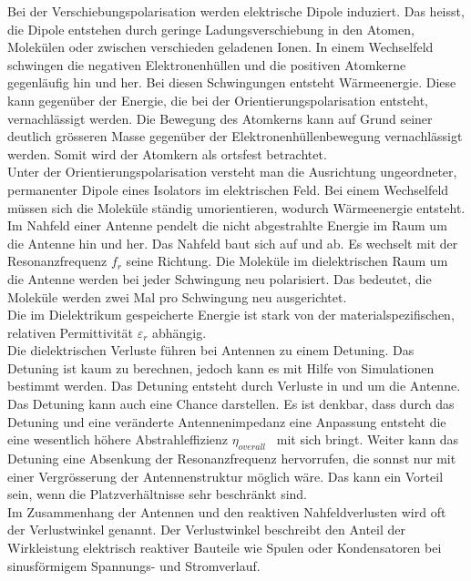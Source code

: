Bei der Verschiebungspolarisation werden elektrische Dipole  induziert. Das heisst,  die Dipole entstehen durch geringe Ladungsverschiebung in den Atomen, Molekülen oder zwischen verschieden geladenen Ionen. In einem Wechselfeld schwingen die negativen Elektronenhüllen und die positiven Atomkerne gegenläufig hin und her.  Bei diesen Schwingungen entsteht  Wärmeenergie.  Diese kann gegenüber der Energie, die bei der Orientierungspolarisation entsteht,  vernachlässigt werden.  Die Bewegung des Atomkerns kann auf Grund seiner deutlich grösseren Masse  gegenüber der Elektronenhüllenbewegung vernachlässigt werden. Somit wird der Atomkern als ortsfest betrachtet. \\
Unter der Orientierungspolarisation versteht man die Ausrichtung ungeordneter, permanenter Dipole eines Isolators im elektrischen Feld. Bei einem Wechselfeld müssen sich die Moleküle ständig umorientieren, wodurch Wärmeenergie entsteht\cite{DielektrikumPolarisation}.\\
Im Nahfeld einer Antenne pendelt die nicht abgestrahlte Energie im Raum um die Antenne hin und her. Das Nahfeld baut sich auf und ab. Es wechselt  mit der Resonanzfrequenz $f_{r}$ seine Richtung. Die Moleküle im dielektrischen Raum um die Antenne werden bei jeder Schwingung neu polarisiert. Das bedeutet, die Moleküle werden zwei Mal pro Schwingung neu ausgerichtet.\\
Die im Dielektrikum gespeicherte Energie ist stark von der materialspezifischen, relativen Permittivität $\varepsilon_r $ abhängig.\\
Die dielektrischen Verluste führen bei Antennen  zu einem Detuning. Das Detuning ist kaum zu berechnen, jedoch kann es mit Hilfe von  Simulationen bestimmt werden. Das Detuning entsteht durch Verluste in und um die  Antenne.\\ 
Das Detuning kann auch eine Chance darstellen. Es ist denkbar, dass durch das Detuning und eine veränderte Antennenimpedanz eine Anpassung  entsteht die  eine wesentlich höhere Abstrahleffizienz $\eta_{overall}$ \ mit sich bringt. Weiter kann das Detuning eine Absenkung der Resonanzfrequenz hervorrufen, die sonnst nur mit einer Vergrösserung der Antennenstruktur möglich wäre. Das kann ein Vorteil sein, wenn die Platzverhältnisse sehr beschränkt sind.\\
Im Zusammenhang der Antennen und den reaktiven Nahfeldverlusten wird oft der Verlustwinkel genannt.  Der Verlustwinkel beschreibt den Anteil der Wirkleistung elektrisch reaktiver Bauteile wie Spulen oder Kondensatoren bei sinusförmigem Spannungs- und Stromverlauf.\\
